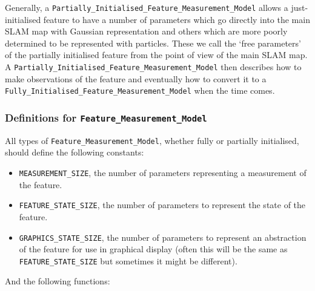 \documentclass{article}
\begin{document}
Generally, a {\tt Partially\_Initialised\_Feature\_Measurement\_Model}
allows a just-initialised feature to have a number of parameters which
go directly into the main SLAM map with Gaussian representation and
others which are more poorly determined to be represented with
particles. These we call the `free parameters' of the partially
initialised feature from the point of view of the main SLAM map. A
{\tt Partially\_Initialised\_Feature\_Measurement\_Model} then
describes how to make observations of the feature and eventually how
to convert it to a {\tt
  Fully\_Initialised\_Feature\_Measurement\_Model} when the time
comes.

\subsubsection{Definitions for {\tt Feature\_Measurement\_Model}}

All types of {\tt Feature\_Measurement\_Model}, whether fully or
partially initialised, should define the following constants:

\begin{itemize}
\item {\tt MEASUREMENT\_SIZE}, the number of parameters representing a
  measurement of the feature.
\item {\tt FEATURE\_STATE\_SIZE}, the number of parameters to
  represent the state of the feature.
\item {\tt GRAPHICS\_STATE\_SIZE}, the number of parameters to
  represent an abstraction of the feature for use in graphical display
  (often this will be the same as {\tt FEATURE\_STATE\_SIZE} but
  sometimes it might be different).
\end{itemize}

And the following functions:
\end{document}
